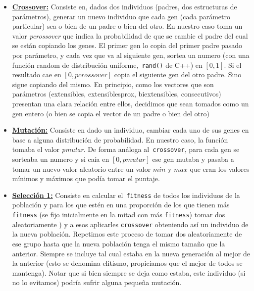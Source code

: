 \documentclass[A4paper,oneside,fleqn,11pt]{article}
\theoremstyle{definition}
\begin{document}
\begin{itemize}
\item \textbf{\underline{Crossover:}} Consiste en, dados dos individuos (padres, dos estructuras de parámetros), generar un nuevo individuo que cada gen (cada parámetro particular) sea o bien de un padre o bien del otro. En nuestro caso toma un valor\textit{ pcrossover} que indica la probabilidad de que se cambie el padre del cual se están copiando los genes. El primer gen lo copia del primer padre pasado por parámetro, y cada vez que va al siguiente gen, sortea un numero (con una función random de distribución uniforme,\texttt{ rand()} de C++) en $[0,1]$. Si el resultado cae en $[0,pcrossover]$ copia el siguiente gen del otro padre. Sino sigue copiando del mismo. En principio, como los vectores que son parámetros (extensibles, extensiblesprox, biextensibles, consecutivos) presentan una clara relación entre ellos, decidimos que sean tomados como un gen entero (o bien se copia el vector de un padre o bien del otro)

\item \textbf{\underline{Mutación:}} Consiste en dado un individuo, cambiar cada uno de sus genes en base a alguna distribución de probabilidad. En nuestro caso, la función tomaba el valor\textit{ pmutar}. De forma análoga al\texttt{ crossover}, para cada gen se sorteaba un numero y si caía en $[0,pmutar]$ ese gen mutaba y pasaba a tomar un nuevo valor aleatorio entre un valor $min$ y $max$ que eran los valores mínimos y máximos que podía tomar el puntaje.


\item \textbf{\underline{Selección 1:}} Consiste en calcular el\texttt{ fitness} de todos los individuos de la población y para los que estén en una proporción de los que tienen más \texttt{fitness} (se fijo inicialmente en la mitad con más \texttt{fitness}) tomar dos aleatoriamente %
) y a esos aplicarles \texttt{crossover} obteniendo así un individuo de la nueva población. Repetimos este proceso de tomar dos aleatoriamente de ese grupo hasta que la nueva población tenga el mismo tamaño que la anterior. Siempre se incluye tal cual estaba en la nueva generación al mejor de la anterior (esto se denomina elitismo, propiciamos que el mejor de todos se mantenga). Notar que si bien siempre se deja como estaba, este individuo (si no lo evitamos) podría sufrir alguna pequeña mutación.


\end{itemize}
\end{document}
